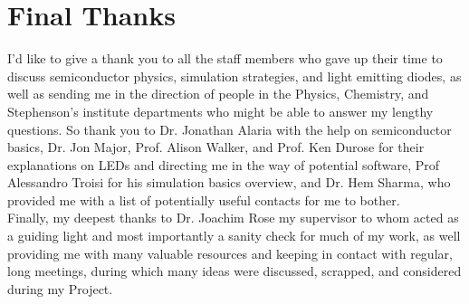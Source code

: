 \documentclass[titlepage]{article}
\begin{document}
\section{Final Thanks}
I'd like to give a thank you to all the staff members who gave up their time to discuss semiconductor physics, simulation strategies, and light emitting diodes, as well as sending me in the direction of people in the Physics, Chemistry, and Stephenson's institute departments who might be able to answer my lengthy questions. So thank you to Dr. Jonathan Alaria with the help on semiconductor basics, Dr. Jon Major, Prof. Alison Walker, and Prof. Ken Durose for their explanations on LEDs and directing me in the way of potential software, Prof Alessandro Troisi for his simulation basics overview, and Dr. Hem Sharma, who provided me with a list of potentially useful contacts for me to bother.\\
Finally, my deepest thanks to Dr. Joachim Rose my supervisor to whom acted as a guiding light and most importantly a sanity check for much of my work, as well providing me with many valuable resources and keeping in contact with regular, long meetings, during which many ideas were discussed, scrapped, and considered during my Project.
\end{document}
